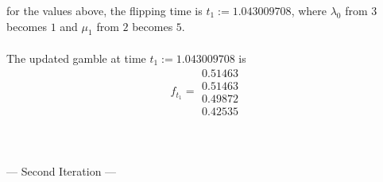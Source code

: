 \documentclass{article}
\begin{document}
for the values above, the flipping time is $t_{1}:= 1.043009708$, where $\lambda_{0}$ from $3$ becomes $1$ and $\mu_{1}$ from $2$ becomes $5$.\\\\
The updated gamble at time $t_{1}:= 1.043009708$ is
\begin{equation*} 
 f_{t_1}= 
 \begin{array}{|c|}
  0.51463\\
  0.51463\\
  0.49872\\
  0.42535  
 \end{array}
 \end{equation*}\\\\\\


--- Second Iteration ---
\end{document}
